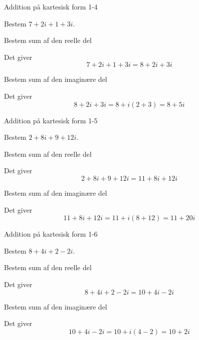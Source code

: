 \documentclass{article}
\begin{document}
\newpage

\begin{exercise}{Addition på kartesisk form 1-4}
	
	Bestem $7+2i+1+3i$.
	
	
	\hint
	
	Bestem sum af den reelle del
	
	\hint
	
	Det giver
	\[
	7+2i+1+3i = 8 + 2i+3i
	\]
	
	\hint
	
	Bestem sum af den imaginære del 
	
	
	\hint
	
	Det giver 
	\[
	8 + 2i+3i = 8 + i(2+3) =  8 + 5i
	\]
	
\end{exercise}

\newpage

\begin{exercise}{Addition på kartesisk form 1-5}
	
	Bestem $2+8i+9+12i$.
	
	
	\hint
	
	Bestem sum af den reelle del
	
	\hint
	
	Det giver
	\[
	2+8i+9+12i = 11 + 8i + 12i
	\]
	
	\hint
	
	Bestem sum af den imaginære del 
	
	
	\hint
	
	Det giver 
	\[
	11 + 8i + 12i = 11 + i(8+12) = 11 + 20i
	\]
	
\end{exercise}

\newpage

\begin{exercise}{Addition på kartesisk form 1-6}
	
	Bestem $8+4i+2-2i$.
	
	
	\hint
	
	Bestem sum af den reelle del
	
	\hint
	
	Det giver
	\[
	8+4i+2-2i =  10 + 4i - 2i
	\]
	
	\hint
	
	Bestem sum af den imaginære del 
	
	
	\hint
	
	Det giver 
	\[
	10 + 4i - 2i = 10 + i(4-2) =  10  + 2i
	\]
	
\end{exercise}
\end{document}
